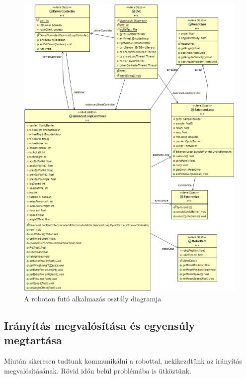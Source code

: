 \pagebreak
\begin{figure}[h]
	\centering
	\includegraphics[width=1\textwidth]{images/gyroBoyUML.png}
	\caption{A roboton futó alkalmazás osztály diagramja}
	\label{fig:gyroBoyUML}
\end{figure}
\pagebreak

\subsection{Irányítás megvalósítása és egyensúly megtartása}

Miután sikeresen tudtunk kommunikálni a robottal, nekikezdtünk az irányítás megvalósításának. Rövid időn belül problémába is ütköztünk.


